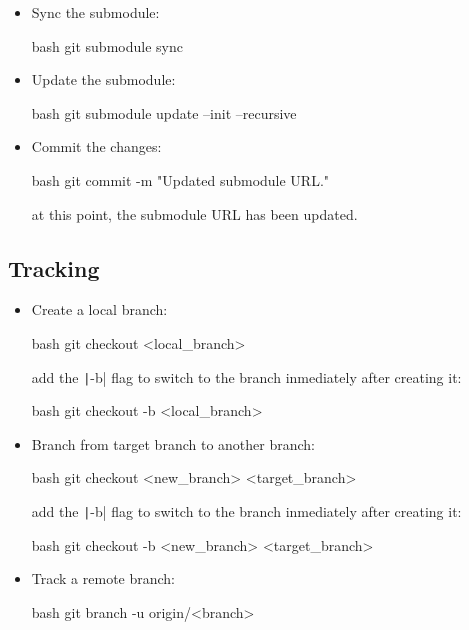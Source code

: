 \begin{itemize}
\begin{itemize}
        \item Sync the submodule:
        \begin{mintedbox}{bash}
git submodule sync
        \end{mintedbox}
        \item Update the submodule:
        \begin{mintedbox}{bash}
git submodule update --init --recursive
        \end{mintedbox}
        \item Commit the changes:
        \begin{mintedbox}{bash}
git commit -m "Updated submodule URL."
        \end{mintedbox}
        at this point, the submodule URL has been updated.
    \end{itemize}
\end{itemize}


\subsection{Tracking}

\begin{itemize}
    \item Create a local branch:
    \begin{mintedbox}{bash}
git checkout <local_branch>
    \end{mintedbox}
    add the \texttt|-b| flag to switch to the branch inmediately after creating it:
    \begin{mintedbox}{bash}
git checkout -b <local_branch>
    \end{mintedbox}
    \item Branch from target branch to another branch:
    \begin{mintedbox}{bash}
git checkout <new_branch> <target_branch>
    \end{mintedbox}
    add the \texttt|-b| flag to switch to the branch inmediately after creating it:
    \begin{mintedbox}{bash}
git checkout -b <new_branch> <target_branch>
    \end{mintedbox}
    \item Track a remote branch:
    \begin{mintedbox}{bash}
git branch -u origin/<branch>
    \end{mintedbox}
\end{itemize}
